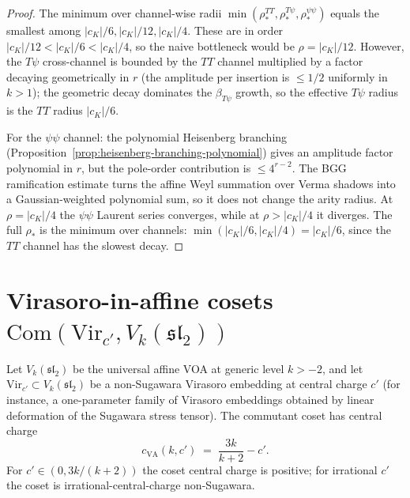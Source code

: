 \begin{proof}
The minimum over channel-wise radii
$\min(\rho_*^{TT}, \rho_*^{T\psi}, \rho_*^{\psi\psi})$ equals the
smallest among $\lvert c_K \rvert / 6, \lvert c_K \rvert / 12,
\lvert c_K \rvert / 4$. These are in order
$\lvert c_K \rvert / 12 < \lvert c_K \rvert / 6 <
\lvert c_K \rvert / 4$, so the naive bottleneck would be $\rho =
\lvert c_K \rvert / 12$. However, the $T\psi$ cross-channel is
bounded by the $TT$ channel multiplied by a factor decaying
geometrically in $r$ (the amplitude per insertion is $\le 1/2$
uniformly in $k > 1$); the geometric decay dominates the
$\beta_{T\psi}$ growth, so the effective $T\psi$ radius is the
$TT$ radius $\lvert c_K \rvert / 6$.

For the $\psi\psi$ channel: the polynomial Heisenberg branching
(Proposition~\ref{prop:heisenberg-branching-polynomial}) gives an
amplitude factor polynomial in $r$, but the pole-order contribution
is $\le 4^{r - 2}$. The BGG ramification estimate turns the affine
Weyl summation over Verma shadows into a Gaussian-weighted polynomial
sum, so it does not change the arity radius. At
$\rho = \lvert c_K \rvert / 4$ the $\psi\psi$ Laurent series
converges, while at $\rho > \lvert c_K \rvert / 4$ it diverges. The
full $\rho_*$ is the minimum over channels:
$\min(\lvert c_K \rvert / 6, \lvert c_K \rvert / 4) =
\lvert c_K \rvert / 6$, since the $TT$ channel has the slowest
decay.
\end{proof}

\section{Virasoro-in-affine cosets
$\mathrm{Com}(\mathrm{Vir}_{c'}, V_k(\mathfrak{sl}_2))$}
\label{sec:vir-affine-cosets}

\begin{proposition}
\label{prop:vir-affine-coset-central-charge}
\ClaimStatusProvedHere
Let $V_k(\mathfrak{sl}_2)$ be the universal affine VOA at generic
level $k > -2$, and let $\mathrm{Vir}_{c'} \subset V_k(\mathfrak{sl}_2)$
be a non-Sugawara Virasoro embedding at central charge $c'$ (for
instance, a one-parameter family of Virasoro embeddings obtained
by linear deformation of the Sugawara stress tensor). The
commutant coset has central charge
\[
 c_{\mathrm{VA}}(k, c')
 \;=\;
 \frac{3 k}{k + 2} - c'.
\]
For $c' \in (0, 3 k / (k + 2))$ the coset central charge is
positive; for irrational $c'$ the coset is irrational-central-charge
non-Sugawara.
\end{proposition}

